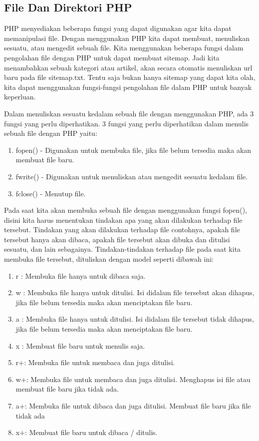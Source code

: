\subsection{File Dan Direktori PHP}
PHP menyediakan beberapa fungsi yang dapat digunakan agar kita dapat memanipulasi file. Dengan menggunakan PHP kita dapat membuat, menuliskan sesuatu, atau  mengedit sebuah file. Kita menggunakan beberapa fungsi dalam pengolahan file dengan PHP untuk dapat membuat sitemap. Jadi kita menambahkan sebuah kategori atau artikel, akan secara otomatis menuliskan url baru pada file sitemap.txt. Tentu saja bukan hanya sitemap yang dapat kita olah, kita dapat menggunakan fungsi-fungsi pengolahan file dalam PHP untuk banyak keperluan.
\par
Dalam menuliskan sesuatu kedalam sebuah file dengan menggunakan PHP, ada 3 fungsi yang perlu diperhatikan. 3 fungsi yang perlu diperhatikan dalam menulis sebuah file dengan PHP yaitu:
\begin{enumerate}
\item fopen() - Digunakan untuk membuka file, jika file belum tersedia maka akan membuat file baru.
\item fwrite() - Digunakan untuk menuliskan atau mengedit sesuatu kedalam file.
\item fclose() - Menutup file.
\end{enumerate}

Pada saat kita akan membuka sebuah file dengan menggunakan fungsi fopen(), disini kita harus menentukan tindakan apa yang akan dilakukan terhadap file tersebut. Tindakan yang akan dilakukan terhadap file contohnya, apakah file tersebut hanya akan dibaca, apakah file tersebut akan dibuka dan ditulisi sesuatu, dan lain sebagainya. Tindakan-tindakan terhadap file pada saat kita membuka file tersebut, dituliskan dengan model seperti dibawah ini:

\begin{enumerate}
\item r  : Membuka file hanya untuk dibaca saja.
\item w : Membuka file hanya untuk ditulisi. Isi didalam file tersebut akan dihapus, jika file belum tersedia maka akan menciptakan file baru.
\item a  : Membuka file hanya untuk ditulisi. Isi didalam file tersebut tidak dihapus, jika file belum tersedia maka akan menciptakan file baru.
\item x  : Membuat file baru untuk menulis saja.
\item r+: Membuka file untuk membaca dan juga ditulisi.
\item w+: Membuka file untuk membaca dan juga ditulisi. Menghapus isi file atau membuat file baru jika tidak ada.
\item a+: Membuka file untuk dibaca dan juga ditulisi. Membuat file baru jika file tidak ada
\item x+: Membuat file baru untuk dibaca / ditulis.
\end{enumerate}

